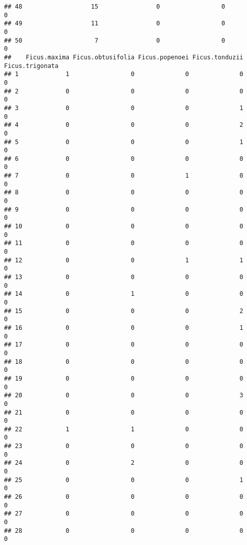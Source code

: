 \documentclass[
]{article}
\begin{document}
\begin{verbatim}
## 48                   15                0                 0              0
## 49                   11                0                 0              0
## 50                    7                0                 0              0
##    Ficus.maxima Ficus.obtusifolia Ficus.popenoei Ficus.tonduzii Ficus.trigonata
## 1             1                 0              0              0               0
## 2             0                 0              0              0               0
## 3             0                 0              0              1               0
## 4             0                 0              0              2               0
## 5             0                 0              0              1               0
## 6             0                 0              0              0               0
## 7             0                 0              1              0               0
## 8             0                 0              0              0               0
## 9             0                 0              0              0               0
## 10            0                 0              0              0               0
## 11            0                 0              0              0               0
## 12            0                 0              1              1               0
## 13            0                 0              0              0               0
## 14            0                 1              0              0               0
## 15            0                 0              0              2               0
## 16            0                 0              0              1               0
## 17            0                 0              0              0               0
## 18            0                 0              0              0               0
## 19            0                 0              0              0               0
## 20            0                 0              0              3               0
## 21            0                 0              0              0               0
## 22            1                 1              0              0               0
## 23            0                 0              0              0               0
## 24            0                 2              0              0               0
## 25            0                 0              0              1               0
## 26            0                 0              0              0               0
## 27            0                 0              0              0               0
## 28            0                 0              0              0               0

\end{verbatim}
\end{document}
